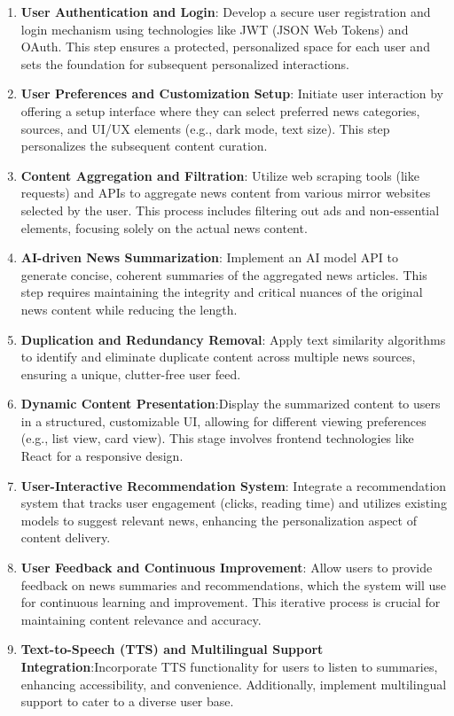 \documentclass[a4paper]{article}
\begin{document}
\begin{enumerate}
    \item {\bf User Authentication and Login}: Develop a secure user registration and login mechanism using technologies like JWT (JSON Web Tokens) and OAuth. This step ensures a protected, personalized space for each user and sets the foundation for subsequent personalized interactions.
    \item {\bf User Preferences and Customization Setup}: Initiate user interaction by offering a setup interface where they can select preferred news categories, sources, and UI/UX elements (e.g., dark mode, text size). This step personalizes the subsequent content curation.
    \item {\bf Content Aggregation and Filtration}: Utilize web scraping tools (like requests) and APIs to aggregate news content from various mirror websites selected by the user. This process includes filtering out ads and non-essential elements, focusing solely on the actual news content.
    \item {\bf AI-driven News Summarization}: Implement an AI model API to generate concise, coherent summaries of the aggregated news articles. This step requires maintaining the integrity and critical nuances of the original news content while reducing the length.
    \item {\bf Duplication and Redundancy Removal}: Apply text similarity algorithms to identify and eliminate duplicate content across multiple news sources, ensuring a unique, clutter-free user feed.
    \item {\bf Dynamic Content Presentation}:Display the summarized content to users in a structured, customizable UI, allowing for different viewing preferences (e.g., list view, card view). This stage involves frontend technologies like React for a responsive design.
    \item {\bf User-Interactive Recommendation System}: Integrate a recommendation system that tracks user engagement (clicks, reading time) and utilizes existing models to suggest relevant news, enhancing the personalization aspect of content delivery.
    \item {\bf User Feedback and Continuous Improvement}: Allow users to provide feedback on news summaries and recommendations, which the system will use for continuous learning and improvement. This iterative process is crucial for maintaining content relevance and accuracy.
    \item {\bf Text-to-Speech (TTS) and Multilingual Support Integration}:Incorporate TTS functionality for users to listen to summaries, enhancing accessibility, and convenience. Additionally, implement multilingual support to cater to a diverse user base.

\end{enumerate}
\end{document}
